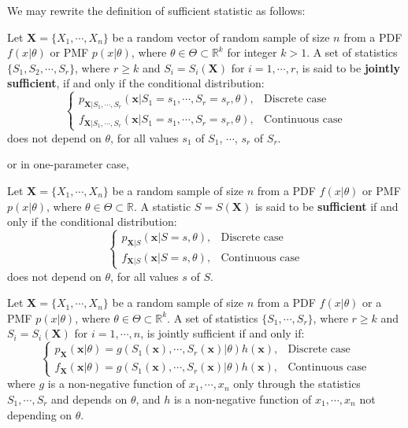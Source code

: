 \documentclass{huhtakm-template-book-v2}
\begin{document}
We may rewrite the definition of sufficient statistic as follows:
\begin{defn}
	Let $\mathbf{X}=\{X_{1},\cdots,X_{n}\}$ be a random vector of random sample of size $n$ from a PDF $f(x|\theta)$ or PMF $p(x|\theta)$, where $\theta\in\Theta\subset\mathbb{R}^{k}$ for integer $k>1$. A set of statistics $\{S_{1},S_{2},\cdots,S_{r}\}$, where $r\geq k$ and $S_{i}=S_{i}(\mathbf{X})$ for $i=1,\cdots,r$, is said to be \textbf{jointly sufficient}, if and only if the conditional distribution:
	\begin{equation*}
		\begin{cases}
			p_{\mathbf{X}|S_{1},\cdots,S_{r}}(\mathbf{x}|S_{1}=s_{1},\cdots,S_{r}=s_{r},\theta), &\text{Discrete case}\\
			f_{\mathbf{X}|S_{1},\cdots,S_{r}}(\mathbf{x}|S_{1}=s_{1},\cdots,S_{r}=s_{r},\theta), &\text{Continuous case}
		\end{cases}
	\end{equation*}
	does not depend on $\theta$, for all values $s_{1}$ of $S_{1}$, $\cdots$, $s_{r}$ of $S_{r}$.
\end{defn}
or in one-parameter case,
\begin{defn}
	Let $\mathbf{X}=\{X_{1},\cdots,X_{n}\}$ be a random sample of size $n$ from a PDF $f(x|\theta)$ or PMF $p(x|\theta)$, where $\theta\in\Theta\subset\mathbb{R}$. A statistic $S=S(\mathbf{X})$ is said to be \textbf{sufficient} if and only if the conditional distribution:
	\begin{equation*}
		\begin{cases}
			p_{\mathbf{X}|S}(\mathbf{x}|S=s,\theta), &\text{Discrete case}\\
			f_{\mathbf{X}|S}(\mathbf{x}|S=s,\theta), &\text{Continuous case}
		\end{cases}
	\end{equation*}
	does not depend on $\theta$, for all values $s$ of $S$.
\end{defn}
\begin{thm}
	Let $\mathbf{X}=\{X_{1},\cdots,X_{n}\}$ be a random sample of size $n$ from a PDF $f(x|\theta)$ or a PMF $p(x|\theta)$, where $\theta\in\Theta\subset\mathbb{R}^{k}$. A set of statistics $\{S_{1},\cdots,S_{r}\}$, where $r\geq k$ and $S_{i}=S_{i}(\mathbf{X})$ for $i=1,\cdots,n$, is jointly sufficient if and only if:
	\begin{equation*}
		\begin{cases}
			p_{\mathbf{X}}(\mathbf{x}|\theta)=g(S_{1}(\mathbf{x}),\cdots,S_{r}(\mathbf{x})|\theta)h(\mathbf{x}), &\text{Discrete case}\\
			f_{\mathbf{X}}(\mathbf{x}|\theta)=g(S_{1}(\mathbf{x}),\cdots,S_{r}(\mathbf{x})|\theta)h(\mathbf{x}), &\text{Continuous case}
		\end{cases}
	\end{equation*}
	where $g$ is a non-negative function of $x_{1},\cdots,x_{n}$ only through the statistics $S_{1},\cdots,S_{r}$ and depends on $\theta$, and $h$ is a non-negative function of $x_{1},\cdots,x_{n}$ not depending on $\theta$.
\end{thm}
\end{document}
